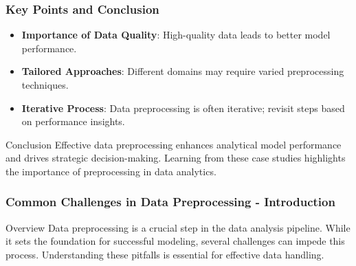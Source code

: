 \documentclass[aspectratio=169]{beamer}
\begin{document}
\begin{frame}[fragile]
    \frametitle{Key Points and Conclusion}
    \begin{itemize}
        \item \textbf{Importance of Data Quality}: High-quality data leads to better model performance.
        \item \textbf{Tailored Approaches}: Different domains may require varied preprocessing techniques.
        \item \textbf{Iterative Process}: Data preprocessing is often iterative; revisit steps based on performance insights.
    \end{itemize}
    
    \begin{block}{Conclusion}
        Effective data preprocessing enhances analytical model performance and drives strategic decision-making. Learning from these case studies highlights the importance of preprocessing in data analytics.
    \end{block}
\end{frame}

\begin{frame}[fragile]
    \frametitle{Common Challenges in Data Preprocessing - Introduction}
    \begin{block}{Overview}
        Data preprocessing is a crucial step in the data analysis pipeline. While it sets the foundation for successful modeling, several challenges can impede this process. Understanding these pitfalls is essential for effective data handling.
    \end{block}
\end{frame}
\end{document}
